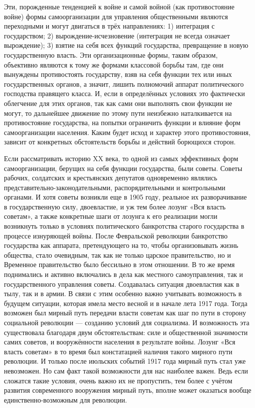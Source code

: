 \documentclass[../main]{subfiles}
\begin{document}
Эти, порожденные тенденцией к войне и самой войной (как противостояние войне) формы самоорганизации для управления общественными являются переходными и могут двигаться в трёх направлениях: 1) интеграция с государством; 2) вырождение-исчезновение (интеграция не всегда означает вырождение); 3) взятие на себя всех функций государства, превращение в новую государственную власть. Эти организационные формы, таким образом, объективно являются к тому же формами классовой борьбы там, где они вынуждены противостоять государству, взяв на себя функции тех или иных государственных органов, а значит, лишить полномочий аппарат политического господства правящего класса. И, если в определённых условиях это фактически облегчение для этих органов, так как сами они выполнять свои функции не могут, то дальнейшее движение по этому пути неизбежно наталкивается на противостояние государства, на попытки ограничить функции и влияние форм самоорганизации населения. Каким будет исход и характер этого противостояния, зависит от конкретных обстоятельств борьбы и действий борющихся сторон.

Если рассматривать историю XX века, то одной из самых эффективных форм самоорганизации, берущих на себя функции государства, были советы. Советы рабочих, солдатских и крестьянских депутатов одновременно являлись представительно-законодательными, распорядительными и контрольными органами. И хотя советы возникли еще в 1905 году, реальное их разворачивание в государственную силу, двоевластие, и уж тем более лозунг «Вся власть советам», а также конкретные шаги от лозунга к его реализации могли возникнуть только в условиях политического банкротства старого государства в процессе изнуряющей войны. После Февральской революции банкротство государства как аппарата, претендующего на то, чтобы организовывать жизнь общества, стало очевидным, так как не только царское правительство, но и Временное правительство было бессильно в этом отношении. В то же время поднимались и активно включались в дела как местного самоуправления, так и государственного управления советы. Создавалась ситуация двоевластия как в тылу, так и в армии. В связи с этим особенно важно учитывать возможность в будущем ситуации, которая имела место весной и в начале лета 1917 года. Тогда возможен был мирный путь передачи власти советам как шаг по пути в сторону социальной революции — созданию условий для социализма. И возможность эта существовала благодаря двум обстоятельствам: силе и общественной значимости самих советов, и вооружённости населения в результате войны. Лозунг «Вся власть советам» в то время был констатацией наличия такого мирного пути революции. И только после июльских событий 1917 года мирный путь стал уже невозможен. Но сам факт такой возможности для нас наиболее важен. Ведь если сложатся такие условия, очень важно их не пропустить, тем более с учётом развития современного вооружения мирный путь, вполне может оказаться вообще единственно-возможным для революции.
\end{document}
